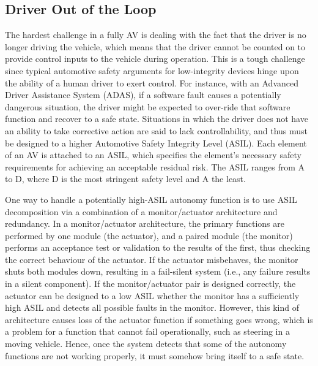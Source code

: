 \documentclass[a4paper, 10pt]{article}
\begin{document}
\subsection{Driver Out of the Loop}
The hardest challenge in a fully AV is dealing with the fact that the driver is no longer driving the vehicle, which means that the driver cannot be counted on to provide control inputs to the vehicle during operation. This is a tough challenge since typical automotive safety arguments for low-integrity devices hinge upon the ability of a human driver to exert control. For instance, with an Advanced Driver Assistance System (ADAS), if a software fault causes a potentially dangerous situation, the driver might be expected to over-ride that software function and recover to a safe state. Situations in which the driver does not have an ability to take corrective action are said to lack controllability, and thus must be designed to a higher Automotive Safety Integrity Level (ASIL). Each element of an AV is attached to an ASIL, which specifies the element's necessary safety requirements for achieving an acceptable residual risk. The ASIL ranges from A to D, where D is the most stringent safety level and A the least.

One way to handle a potentially high-ASIL autonomy function is to use ASIL decomposition via a combination of a monitor/actuator architecture and redundancy. In a monitor/actuator architecture, the primary functions are performed by one module (the actuator), and a paired module (the monitor) performs an acceptance test or validation to the results of the first, thus checking the correct behaviour of the actuator. If the actuator misbehaves, the monitor shuts both modules down, resulting in a fail-silent system (i.e., any failure results in a silent component). If the monitor/actuator pair is designed correctly, the actuator can be designed to a low ASIL whether the monitor has a sufficiently high ASIL and detects all possible faults in the monitor. However, this kind of architecture causes loss of the actuator function if something goes wrong, which is a problem for a function that cannot fail operationally, such as steering in a moving vehicle. Hence, once the system detects that some of the autonomy functions are not working properly, it must somehow bring itself to a safe state.
\end{document}
